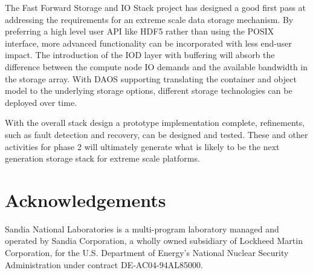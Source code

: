 \documentclass{sig-alt-gov2}
\begin{document}
The Fast Forward Storage and IO Stack project has designed a good first pass at
addressing the requirements for an extreme scale data storage mechanism.  By
preferring a high level user API like HDF5 rather than using the POSIX
interface, more advanced functionality can be incorporated with less end-user
impact. The introduction of the IOD layer with buffering will absorb the
difference between the compute node IO demands and the available bandwidth in
the storage array. With DAOS supporting translating the container and object
model to the underlying storage options, different storage technologies can be
deployed over time.

With the overall stack design a prototype implementation complete, refinements,
such as fault detection and recovery, can be designed and tested.  These and
other activities for phase 2 will ultimately generate what is likely to be the
next generation storage stack for extreme scale platforms.

\section{Acknowledgements}

Sandia National Laboratories is a multi-program laboratory managed and operated
by Sandia Corporation, a wholly owned subsidiary of Lockheed Martin
Corporation, for the U.S. Department of Energy's National Nuclear Security
Administration under contract DE-AC04-94AL85000.




\vfill\eject
\end{document}
